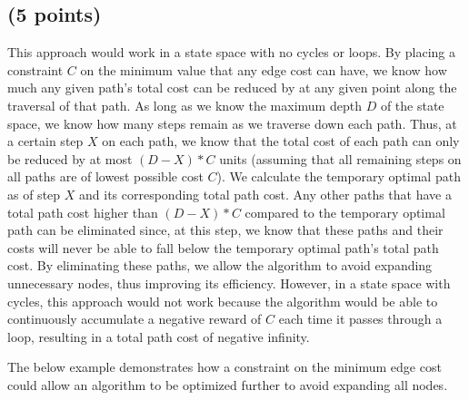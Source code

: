 \documentclass[12pt]{article}
\begin{document}
\subsection{(5 points)}
This approach would work in a state space with no cycles or loops. By placing a constraint $C$ on the minimum value that any edge cost can have, we know how much any given path's total cost can be reduced by at any given point along the traversal of that path. As long as we know the maximum depth $D$ of the state space, we know how many steps remain as we traverse down each path. Thus, at a certain step $X$ on each path, we know that the total cost of each path can only be reduced by at most $(D - X)*C$ units (assuming that all remaining steps on all paths are of lowest possible cost $C$). We calculate the temporary optimal path as of step $X$ and its corresponding total path cost. Any other paths that have a total path cost higher than $(D-X)*C$ compared to the temporary optimal path can be eliminated since, at this step, we know that these paths and their costs will never be able to fall below the temporary optimal path's total path cost. By eliminating these paths, we allow the algorithm to avoid expanding unnecessary nodes, thus improving its efficiency. However, in a state space with cycles, this approach would not work because the algorithm would be able to continuously accumulate a negative reward of $C$ each time it passes through a loop, resulting in a total path cost of negative infinity. 

The below example demonstrates how a constraint on the minimum edge cost could allow an algorithm to be optimized further to avoid expanding all nodes. 
\begin{center}
\end{center}
\end{document}
